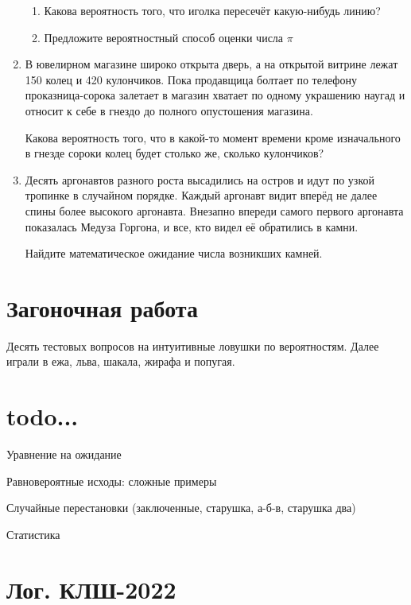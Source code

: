 \documentclass[12pt]{article}
\theoremstyle{definition}
\begin{document}
\begin{enumerate}
\begin{enumerate}
\item Какова вероятность того, что иголка пересечёт какую-нибудь линию?
\item Предложите вероятностный способ оценки числа $\pi$
\end{enumerate}

\item В ювелирном магазине широко открыта дверь, а на открытой витрине лежат 150 колец и 420 кулончиков. 
Пока продавщица болтает по телефону проказница-сорока залетает в магазин хватает по одному украшению наугад и относит к себе в гнездо
 до полного опустошения магазина.

Какова вероятность того, что в какой-то момент времени кроме изначального в гнезде сороки колец будет столько же, сколько кулончиков?
\item Десять аргонавтов разного роста высадились на остров и идут по узкой тропинке в случайном порядке.
Каждый аргонавт видит вперёд не далее спины более высокого аргонавта.
Внезапно впереди самого первого аргонавта показалась Медуза Горгона, и все,
кто видел её обратились в камни.

Найдите математическое ожидание числа возникших камней.

\end{enumerate}

\section{Загоночная работа}

Десять тестовых вопросов на интуитивные ловушки по вероятностям. 
Далее играли в ежа, льва, шакала, жирафа и попугая.


\section{todo...}

Уравнение на ожидание



Равновероятные исходы: сложные примеры

Случайные перестановки (заключенные, старушка, а-б-в, старушка два)

Статистика








\newpage

\section{Лог. КЛШ-2022}
\end{document}
